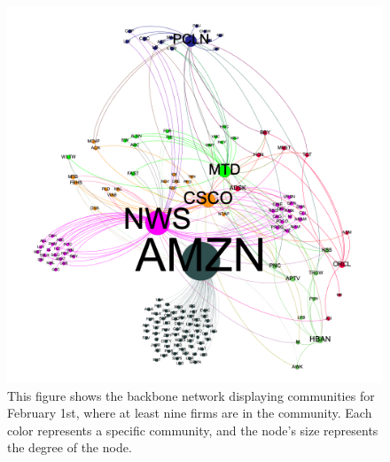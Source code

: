 \begin{figure}[htb!]
  \centerline{\includegraphics[scale=0.5]{figures/EarnAnnounceTE/20180201OnlyC-curved.png}}
  \caption{This figure shows the backbone network displaying communities for February 1st, where at least nine firms are in the community.  Each color represents a specific community, and the node's size represents the degree of the node.}
  \label{fig:Community20180201}
\end{figure}

